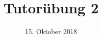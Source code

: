 %
% 
% 
%







\newcommand{\Datum}{\today}

\renewcommand{\PraesentationFusszeileZusatz}{| Tutorium Einführung in die Rechnerarchitektur WS 2018/2019}

\title{Tutorübung 2}
\author{\PersonVorname{} \PersonNachname}
\institute[]{\UniversitaetName \\ \FakultaetName}
\date[\Datum]{15. Oktober 2018}



\setlength{\baselineskip}{\PraesentationAbstandAbsatz}
\setlength{\parskip}{\baselineskip}

\PraesentationMasterStandard

\PraesentationTitelseite %

